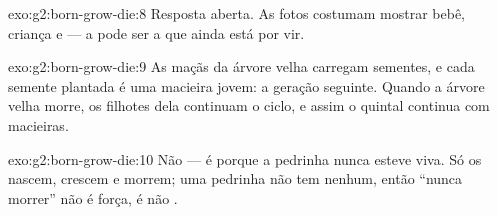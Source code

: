 \begin{solution}{exo:g2:born-grow-die:8}
Resposta aberta. As fotos costumam mostrar bebê, criança e 
--- a  pode ser a  que ainda está por vir.
\end{solution}

\begin{solution}{exo:g2:born-grow-die:9}
As maçãs da árvore velha carregam sementes, e cada semente plantada
é uma macieira jovem: a geração seguinte. Quando a árvore velha
morre, os filhotes dela continuam o ciclo, e assim o quintal
continua com macieiras.
\end{solution}

\begin{solution}{exo:g2:born-grow-die:10}
Não --- é porque a pedrinha nunca esteve viva. Só os 
nascem, crescem e morrem; uma pedrinha não tem  nenhum,
então ``nunca morrer'' não é força, é não .
\end{solution}
